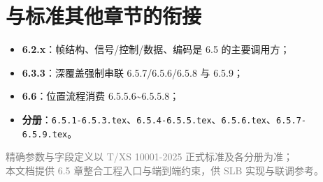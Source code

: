 \documentclass[11pt,a4paper]{ctexart}
\begin{document}
\section{与标准其他章节的衔接}

\begin{itemize}[nosep]
  \item \textbf{6.2.x}：帧结构、信号/控制/数据、编码是 6.5 的主要调用方；
  \item \textbf{6.3.3}：深覆盖强制串联 6.5.7/6.5.6/6.5.8 与 6.5.9；
  \item \textbf{6.6}：位置流程消费 6.5.5.6\textasciitilde 6.5.5.8；
  \item \textbf{分册}：\texttt{6.5.1-6.5.3.tex}、\texttt{6.5.4-6.5.5.tex}、\texttt{6.5.6.tex}、\texttt{6.5.7-6.5.9.tex}。
\end{itemize}

\vfill
\begin{center}
\small\textcolor{gray}{精确参数与字段定义以 T/XS 10001-2025 正式标准及各分册为准；\\
本文档提供 6.5 章整合工程入口与端到端约束，供 SLB 实现与联调参考。}
\end{center}
\end{document}
